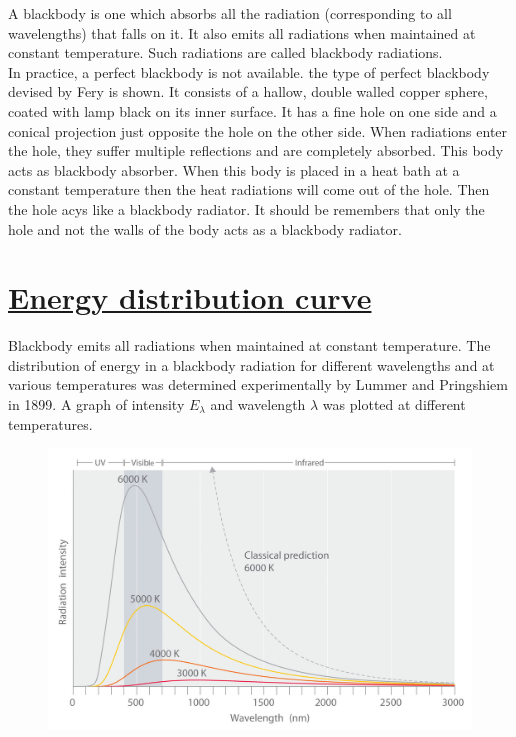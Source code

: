\documentclass[14pt,a4paper]{article}
\begin{document}
A blackbody is one which absorbs all the radiation (corresponding to all wavelengths) that falls on it. It also emits all radiations when maintained at constant temperature. Such radiations are called blackbody radiations.
\\
In practice, a perfect blackbody is not available. the type of perfect blackbody devised by Fery is shown. It consists of a hallow, double walled copper sphere, coated with lamp black on its inner surface. It has a fine hole on one side and a conical projection just opposite the hole on the other side. When radiations enter the hole, they suffer multiple reflections and are completely absorbed. This body acts as blackbody absorber. When this body is placed in a heat bath at a constant temperature then the heat radiations will come out of the hole. Then the hole acys like a blackbody radiator. It should be remembers that only the hole and not the walls of the body acts as a blackbody radiator.

\newpage
\section{\underline{Energy distribution curve}}

Blackbody emits all radiations when maintained at constant temperature. The distribution of energy in a blackbody radiation for different wavelengths and at various temperatures was determined experimentally by Lummer and Pringshiem in 1899. A graph of intensity $E_{\lambda}$ and wavelength $\lambda$ was plotted at different temperatures. 
\begin{figure}[H]
	\centering
	\includegraphics[keepaspectratio=true,scale=0.22]{blackbody_curve.jpg}
\end{figure}
\end{document}
